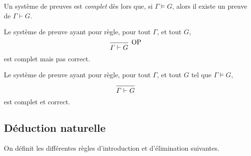 \begin{defn}[Complétude]
	Un système de preuves est \textit{complet} dès lors que, si $\Gamma \models G$, alors il existe un preuve de $\Gamma \vdash G$.
\end{defn}

\begin{exm}
	Le système de preuve ayant pour règle, pour tout $\Gamma$, et tout $G$, \[
		\begin{prooftree}
			\infer0[OP]{\Gamma \vdash G} %
		\end{prooftree}
	\] est complet mais pas correct.
\end{exm}

\begin{exm}
	Le système de preuve ayant pour règle, pour tout $\Gamma$, et tout $G$ tel que $\Gamma \models G$, \[
		\begin{prooftree}
			\infer0{\Gamma \vdash G} %
		\end{prooftree}
	\] est complet et correct.
\end{exm}

\subsection{Déduction naturelle}

On définit les différentes règles d'introduction et d'élimination suivantes.

